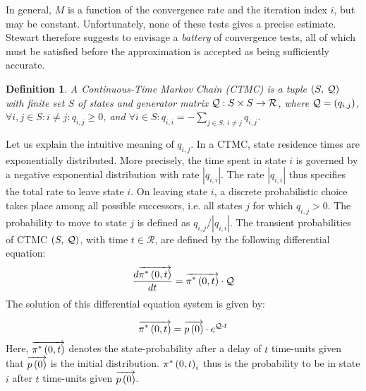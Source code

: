 \documentclass[times, 10pt,twocolumn]{article}
\newtheorem{definition}{Definition}
\begin{document}
		In general, $M$ is a function of the convergence rate and the iteration index $i$, but may be  constant.
		Unfortunately, none of these tests gives a precise estimate.  Stewart \cite{Stewart_94} therefore suggests to envisage a \emph{battery} of convergence tests, all of which must be satisfied before the approximation is accepted as being sufficiently accurate.

		
		\begin{definition}
			A Continuous-Time Markov Chain (\emph{CTMC}) is a tuple $\left( S,\: \mathcal{Q} \right)$ with finite set $S$ of states and generator matrix $\mathcal{Q} : S \times S \rightarrow \mathcal{R}$, where $\mathcal{Q}=\left(q_{i,j}\right)$, $\forall i,j \in S : i \neq j : q_{i,j} \geq 0$, and $\forall i \in S : q_{i,i} = - \sum_{j \in S, \: i \neq j} q_{i,j}$. 
		\end{definition}
		
		Let us explain the intuitive meaning of $q_{i,j}$.  In a CTMC, state residence times are exponentially distributed.  More precisely, the time spent in state $i$ is governed by a negative exponential distribution with rate $|q_{i,i}|$.  The rate $|q_{i,i}|$ thus specifies the total rate to leave state $i$.  On leaving state $i$, a discrete probabilistic choice takes place among all possible successors, i.e. all states $j$ for which $q_{i,j} > 0$.  The probability to move to state $j$ is defined as $q_{i,j} / |q_{i,i}|$.  The transient probabilities of CTMC $\left( S,\: \mathcal{Q} \right)$, with time $t \in \mathcal{R}$, are defined by the following differential equation:
		  \begin{equation}
			\frac{d \overrightarrow{\pi^{*} \left(0, t \right )}}{dt} = \overrightarrow{\pi^{*} \left(0, t \right )} \cdot \mathcal{Q} \nonumber
		  \end{equation}
		The solution of this differential equation system is given by:
		
		\begin{equation}
			\overrightarrow{\pi^{*} \left(0, t \right )} = \overrightarrow{p \left( 0 \right)} \cdot e^{\mathcal{Q}{\cdot}t}
			\label{eq:transient}
		\end{equation}
		Here, $\overrightarrow{\pi^{*} \left(0, t \right )}$ denotes the state-probability after a delay of $t$ time-units given that  $\overrightarrow{p \left( 0 \right)}$ is the initial distribution.  $\pi^{*} \left(0, t \right )_{i}$ thus is the probability to be in state $i$ after $t$ time-units given $\overrightarrow{p \left( 0 \right)}$.
\end{document}
